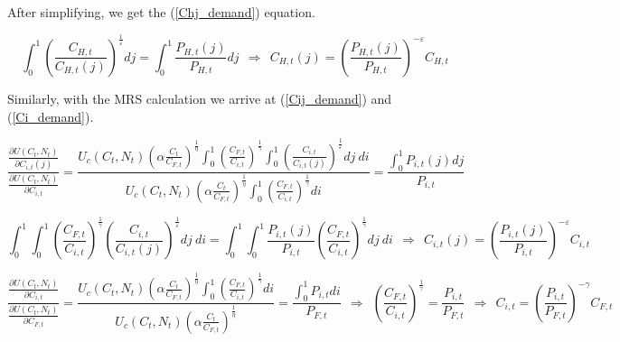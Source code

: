 \documentclass{article}
\begin{document}
After simplifying, we get the (\ref{Chj_demand}) equation.

\begin{equation}
    \displaystyle \int_0^1 \left(\frac{C_{H,t}}{C_{H,t}(j)}\right)^{\frac{1}{\varepsilon}}dj = \displaystyle \int_0^1 \frac{P_{H,t}(j)}{P_{H,t}}dj  \ \ \Rightarrow \ \ C_{H,t}(j)= \left( \frac{P_{H,t}(j)}{P_{H,t}} \right)^{-\varepsilon}C_{H,t}
\end{equation}
    
Similarly, with the MRS calculation we arrive at (\ref{Cij_demand}) and (\ref{Ci_demand}).

\begin{equation}
    \displaystyle \frac{\displaystyle \frac{\partial U(C_t,N_t)}{\displaystyle \partial C_{i,t}(j)}}{\frac{\displaystyle \partial U(C_t,N_t)}{\displaystyle \partial C_{i,t}}} = \frac{\displaystyle U_c(C_t,N_t) \left( \alpha \frac{C_t}{C_{F,t}} \right)^{\frac{1}{\eta}} \int_0^1 \left(\frac{C_{F,t}}{C_{i,t}}\right)^{\frac{1}{\gamma}} \int_0^1 \left(\frac{C_{i,t}}{C_{i,t}(j)}\right)^{\frac{1}{\varepsilon}}dj \ di }{\displaystyle U_c(C_t,N_t) \left( \alpha \frac{C_t}{C_{F,t}} \right)^{\frac{1}{\eta}} \int_0^1 \left(\frac{C_{F,t}}{C_{i,t}}\right)^{\frac{1}{\gamma}} di} = \frac{\displaystyle \int_0^1P_{i,t}(j)dj}{P_{i,t}}
\end{equation}

\begin{equation}
    \displaystyle \int_0^1 \int_0^1 \left(\frac{C_{F,t}}{C_{i,t}}\right)^{\frac{1}{\gamma}} \left(\frac{C_{i,t}}{C_{i,t}(j)}\right)^{\frac{1}{\varepsilon}}dj \ di = \int_0^1 \int_0^1 \frac{\displaystyle P_{i,t}(j)}{P_{i,t}} \left(\frac{C_{F,t}}{C_{i,t}}\right)^{\frac{1}{\gamma}} dj \ di \ \ \Rightarrow \ \
     C_{i,t}(j) = \left( \frac{\displaystyle P_{i,t}(j)}{P_{i,t}} \right)^{-\varepsilon}C_{i,t} 
\end{equation}

\begin{equation}
    \displaystyle \frac{\displaystyle \frac{\partial U(C_t,N_t)}{\displaystyle \partial C_{i,t}}}{\frac{\displaystyle \partial U(C_t,N_t)}{\displaystyle \partial C_{F,t}}} = \frac{\displaystyle U_c(C_t,N_t) \left( \alpha \frac{C_t}{C_{F,t}} \right)^{\frac{1}{\eta}} \int_0^1 \left(\frac{C_{F,t}}{C_{i,t}}\right)^{\frac{1}{\gamma}} di }{\displaystyle U_c(C_t,N_t) \left( \alpha \frac{C_t}{C_{F,t}} \right)^{\frac{1}{\eta}} } = \frac{\displaystyle \int_0^1P_{i,t}di}{P_{F,t}} \ \ \Rightarrow \ \ \left(\frac{C_{F,t}}{C_{i,t}}\right)^{\frac{1}{\gamma}} = \frac{P_{i,t}}{P_{F,t}}  \ \ \Rightarrow \ \ C_{i,t} = \left( \frac{P_{i,t}}{P_{F,t}} \right)^{-\gamma}C_{F,t}
\end{equation}
\end{document}
